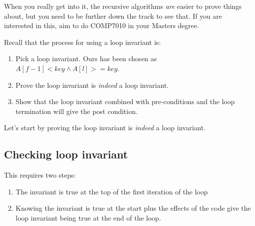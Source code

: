 \documentclass[twoside=false,DIV=14]{scrartcl}
\begin{document}
\begin{note}
When you really get into it, the recursive algorithms \emph{are} easier to prove things about, but you need to be further down the track to see that.  If you are interested in this, aim to do COMP7010 in your Masters degree.
\end{note}

  
     
   

Recall that the process for using a loop invariant is:
\begin{enumerate}
  \item Pick a loop invariant.  Ours has been chosen as $A[f-1] < key \land A[l] >= key$.
  \item Prove the loop invariant is \emph{indeed} a loop invariant.
  \item Show that the loop invariant combined with pre-conditions and the loop termination will give the post condition.
\end{enumerate}
Let's start by proving the loop invariant is \emph{indeed} a loop invariant.
\subsection{Checking loop invariant}
This requires two steps:
\begin{enumerate}
\item The invariant is true at the top of the first iteration of the loop
\item Knowing the invariant is true at the start plus the effects of the code give the loop invariant being true at the end of the loop.
\end{enumerate}
\end{document}
